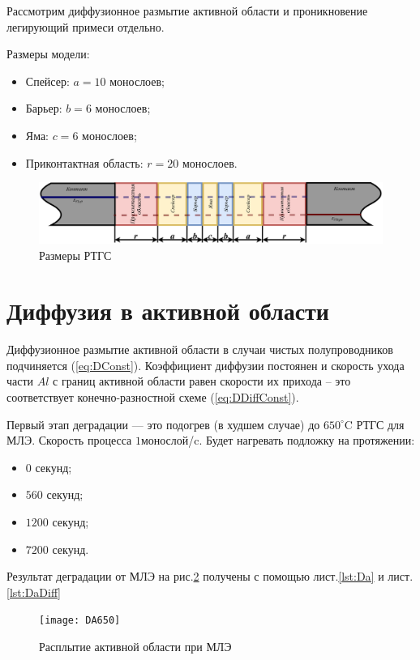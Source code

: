 Рассмотрим диффузионное размытие активной области и проникновение легирующий примеси отдельно.

Размеры модели:
\begin{itemize}
	\item Спейсер: $a = 10$ монослоев;
	\item Барьер: $b = 6$ монослоев;
	\item Яма: $c = 6$ монослоев;
	\item Приконтактная область: $r = 20$ монослоев.
\end{itemize}

\begin{figure}
	\centering
	\includegraphics[width=0.99\linewidth]{assets/RTHS}
	\caption{Размеры РТГС}
	\label{fig:RTHS}
\end{figure}

\section{Диффузия в активной области}
Диффузионное размытие активной области в случаи чистых полупроводников подчиняется (\ref{eq:DConst}). Коэффициент диффузии постоянен и скорость ухода части $Al$ с границ активной области равен скорости их прихода -- это соответствует конечно-разностной схеме (\ref{eq:DDiffConst}).

Первый этап деградации --- это подогрев (в худшем случае) до $650^{\circ}$C РТГС для МЛЭ. Скорость процесса $1$монослой/c. Будет нагревать подложку на протяжении:

\begin{itemize}
	\item $0$ секунд;
	\item $560$ секунд;
	\item $1200$ секунд;
	\item $7200$ секунд.
\end{itemize}

Результат деградации от МЛЭ на рис.\ref{fig:DA650} получены с помощью лист.\ref{lst:Da} и лист.\ref{lst:DaDiff}

\begin{figure}[h!]
	\centering
	\texttt{[image: DA650]}
	\caption{Расплытие активной области при МЛЭ}
	\label{fig:DA650}
\end{figure}

